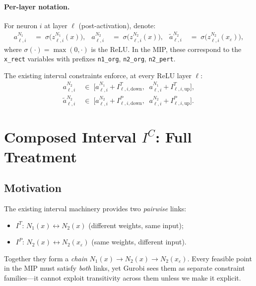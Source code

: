 \documentclass[11pt]{article}
\newcommand{\layerl}{\ell}
\begin{document}
\paragraph{Per-layer notation.}
For neuron $i$ at layer $\layerl$ (post-activation), denote:
\begin{align}
    a^{N_1}_{\layerl,i} &\;=\; \sigma\bigl(z^{N_1}_{\layerl,i}(x)\bigr),
    &
    a^{N_2}_{\layerl,i} &\;=\; \sigma\bigl(z^{N_2}_{\layerl,i}(x)\bigr),
    &
    \tilde{a}^{N_2}_{\layerl,i} &\;=\; \sigma\bigl(z^{N_2}_{\layerl,i}(x_\varepsilon)\bigr),
\end{align}
where $\sigma(\cdot) = \max(0,\cdot)$ is the ReLU. In the MIP, these correspond to the
\texttt{x\_rect} variables with prefixes \texttt{n1\_org}, \texttt{n2\_org}, \texttt{n2\_pert}.

The existing interval constraints enforce, at every ReLU layer $\layerl$:
\begin{align}
    a^{N_2}_{\layerl,i} &\;\in\; \bigl[a^{N_1}_{\layerl,i} + I^T_{\layerl,i,\text{down}},\;\;
                                          a^{N_1}_{\layerl,i} + I^T_{\layerl,i,\text{up}}\bigr],
    \label{eq:transfer}\\[4pt]
    \tilde{a}^{N_2}_{\layerl,i} &\;\in\; \bigl[a^{N_2}_{\layerl,i} + I^P_{\layerl,i,\text{down}},\;\;
                                                  a^{N_2}_{\layerl,i} + I^P_{\layerl,i,\text{up}}\bigr].
    \label{eq:perturbed}
\end{align}


\section{Composed Interval $I^C$: Full Treatment}
\label{sec:composed}

\subsection{Motivation}
\label{sec:composed:motivation}

The existing interval machinery provides two \emph{pairwise} links:
\begin{itemize}
    \item $I^T$: \; $N_1(x) \longleftrightarrow N_2(x)$ \quad
          (different weights, same input);
    \item $I^P$: \; $N_2(x) \longleftrightarrow N_2(x_\varepsilon)$ \quad
          (same weights, different input).
\end{itemize}
Together they form a \emph{chain} $N_1(x) \to N_2(x) \to N_2(x_\varepsilon)$.
Every feasible point in the MIP must satisfy \emph{both} links, yet Gurobi
sees them as separate constraint families---it cannot exploit transitivity
across them unless we make it explicit.
\end{document}
